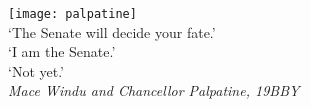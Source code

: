 
\clearpage

\narrowlinespacing

\vspace*{4mm}

\begin{center}
    \texttt{[image: palpatine]}\\
    `The Senate will decide your fate.'\\
    `I am the Senate.'\\
    `Not yet.'\\
    \emph{Mace Windu and Chancellor Palpatine, 19BBY}
\end{center}
\normallinespacing
